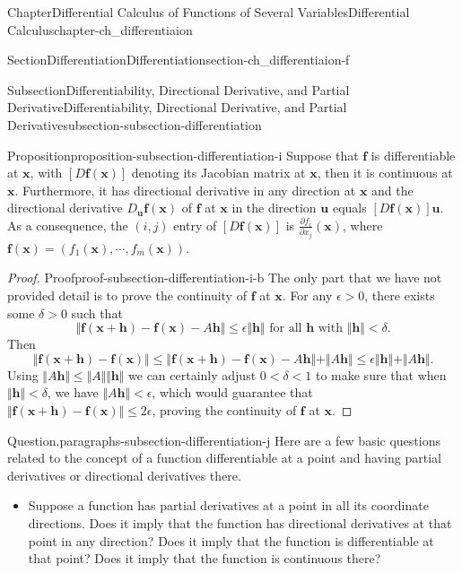 \documentclass[oneside,10pt,]{book}
\numberwithin{equation}{section}
\newcommand{\bff}{\mathbf{f}}
\newcommand{\bu}{\mathbf{u}}
\newcommand{\bx}{\mathbf{x}}
\newcommand{\lt}{<}
\begin{document}
\begin{chapterptx}{Chapter}{Differential Calculus of Functions of Several Variables}{}{Differential Calculus}{}{}{chapter-ch_differentiaion}
\begin{sectionptx}{Section}{Differentiation}{}{Differentiation}{}{}{section-ch_differentiaion-f}
\begin{subsectionptx}{Subsection}{Differentiability, Directional Derivative, and Partial Derivative}{}{Differentiability, Directional Derivative, and Partial Derivative}{}{}{subsection-subsection-differentiation}
\begin{proposition}{Proposition}{}{}{proposition-subsection-differentiation-i}
Suppose that \(\bff\) is differentiable at \(\bx\), with \([D\mathbf f (\bx)]\) denoting its Jacobian matrix at \(\bx\), then it is continuous at \(\bx\). Furthermore, it has directional derivative in any direction at \(\bx\) and the directional derivative \(D_{{\mathbf u}} {\mathbf f}({\mathbf x})\) of \({\mathbf f}\) at \({\mathbf x}\) in the direction \({\mathbf u}\)   equals \([D\mathbf f (\bx)]\bu\). As a consequence, the \((i, j)\) entry of \([D\mathbf f (\bx)]\) is \(\displaystyle{\frac{\partial f_i}{\partial x_j}(\bx)}\), where \(\bff(\bx) =(f_1(\bx), \cdots, f_m(\bx))\).\end{proposition}
\begin{proof}{Proof}{}{proof-subsection-differentiation-i-b}
The only part that we have not provided detail is to prove the continuity of \(\bff\) at \(\bx\). For any \(\epsilon >0\), there exists some \(\delta>0\) such that%
\begin{equation*}
\Vert {\mathbf f}({\mathbf x}+{\mathbf h})- {\mathbf f}({\mathbf x})-A{\mathbf h}\Vert\le \epsilon \Vert {\mathbf h} \Vert
\text{ for all } {\mathbf h} \text { with } \Vert {\mathbf h} \Vert < \delta.
\end{equation*}
Then%
\begin{equation*}
\Vert {\mathbf f}({\mathbf x}+{\mathbf h}) - {\mathbf f}({\mathbf x})\Vert \le 
\Vert {\mathbf f}({\mathbf x}+{\mathbf h})- {\mathbf f}({\mathbf x})-A{\mathbf h}\Vert +   \Vert A{\mathbf h}\Vert
\le  \epsilon \Vert {\mathbf h} \Vert + \Vert A{\mathbf h}\Vert.
\end{equation*}
Using \(\Vert A{\mathbf h}\Vert \le  \Vert A\Vert \Vert {\mathbf h}\Vert\) we can certainly adjust \(0\lt \delta \lt 1\) to make sure that when \(\Vert {\mathbf h} \Vert < \delta\), we have \(\Vert A{\mathbf h}\Vert \lt \epsilon\), which would guarantee that \(\Vert {\mathbf f}({\mathbf x}+{\mathbf h}) - {\mathbf f}({\mathbf x})\Vert \le 
2 \epsilon\), proving the continuity of \(\bff\) at \(\bx\).\end{proof}
\begin{paragraphs}{Question.}{paragraphs-subsection-differentiation-j}%
 Here are  a few basic questions related to the concept of a function differentiable at a point and having partial derivatives or directional derivatives there. %
\begin{itemize}[label=\textbullet]
\item{}Suppose a function has partial derivatives at a point in all its coordinate directions. Does it imply that the function has directional derivatives at that point in any direction? Does it imply that the function is differentiable at that point? Does it imply that the function is continuous there?%

\end{itemize}
\end{paragraphs}
\end{subsectionptx}
\end{sectionptx}
\end{chapterptx}
\end{document}
